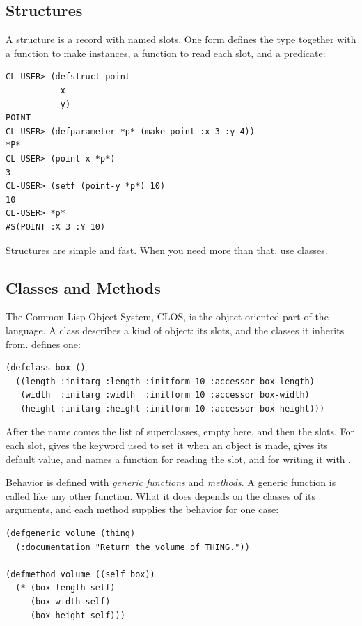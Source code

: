 \subsection{Structures}

A structure is a record with named slots. One 
form defines the type together with a function to make instances, a
function to read each slot, and a predicate:

\begin{verbatim}
CL-USER> (defstruct point
           x
           y)
POINT
CL-USER> (defparameter *p* (make-point :x 3 :y 4))
*P*
CL-USER> (point-x *p*)
3
CL-USER> (setf (point-y *p*) 10)
10
CL-USER> *p*
#S(POINT :X 3 :Y 10)
\end{verbatim}

Structures are simple and fast. When you need more than that, use
classes.

\subsection{Classes and Methods}

The Common Lisp Object System, CLOS, is the object-oriented part of
the language. A class describes a kind of object: its slots, and
the classes it inherits from.  defines one:

\begin{verbatim}
(defclass box ()
  ((length :initarg :length :initform 10 :accessor box-length)
   (width  :initarg :width  :initform 10 :accessor box-width)
   (height :initarg :height :initform 10 :accessor box-height)))
\end{verbatim}

After the name comes the list of superclasses, empty here, and then
the slots. For each slot,  gives the keyword used to
set it when an object is made,  gives its default
value, and  names a function for reading the slot,
and for writing it with .

Behavior is defined with \emph{generic functions} and
\emph{methods}. A generic function is called like any other
function. What it does depends on the classes of its arguments, and
each method supplies the behavior for one case:

\begin{verbatim}
(defgeneric volume (thing)
  (:documentation "Return the volume of THING."))

(defmethod volume ((self box))
  (* (box-length self)
     (box-width self)
     (box-height self)))
\end{verbatim}

